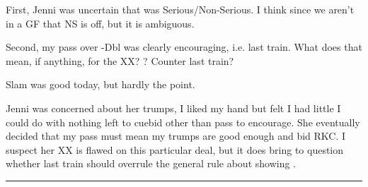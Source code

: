 \documentclass[tom-ari]{subfile}
\begin{document}
First, Jenni was uncertain that  was Serious/Non-Serious. I think since we aren't in a GF that NS is off, but it is ambiguous.

Second, my pass over -Dbl was clearly encouraging, i.e. last train. What does that mean, if anything, for the XX? \first? Counter last train?

Slam was good today, but hardly the point. 

\begin{handdiagram}
\end{handdiagram}

Jenni was concerned about her trumps, I liked my hand but felt I had little I could do with nothing left to cuebid other than pass to encourage. She eventually decided that my pass must mean my trumps are good enough and bid RKC. I suspect her XX is flawed on this particular deal, but it does bring to question whether last train should overrule the general rule about showing \first.

\vspace{1em}\hrule
\end{document}
